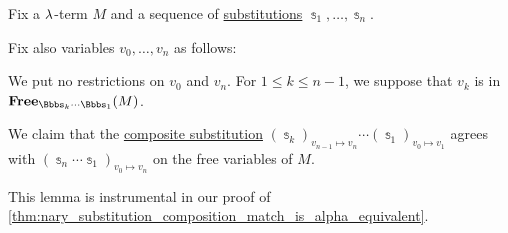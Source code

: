 \begin{lemma}\label{thm:composition_of_lambda_substitutions_lemma}
  Fix a \( {\mathrm \lambda} \)-term \( M \) and a sequence of \hyperref[def:lambda_term_substitution]{substitutions} \( \Bbbs_1, \ldots, \Bbbs_n \).

  Fix also variables \( v_0, \ldots, v_n \) as follows:
  \begin{thmenum}
     We put no restrictions on \( v_0 \) and \( v_n \).
     For \( 1 \leq k \leq n - 1 \), we suppose that \( v_k \) is  in \( \op*{Free}_{\Bbbs_k \cdots \Bbbs_1}(M) \).
  \end{thmenum}

  We claim that the \hyperref[def:lambda_substitution_composition]{composite substitution} \( (\Bbbs_k)_{v_{n-1} \mapsto v_n} \cdots (\Bbbs_1)_{v_0 \mapsto v_1} \) agrees with \( (\Bbbs_n \cdots \Bbbs_1)_{v_0 \mapsto v_n} \) on the free variables of \( M \).
\end{lemma}
\begin{comments}
  \item This lemma is instrumental in our proof of \cref{thm:nary_substitution_composition_match_is_alpha_equivalent}.
\end{comments}
